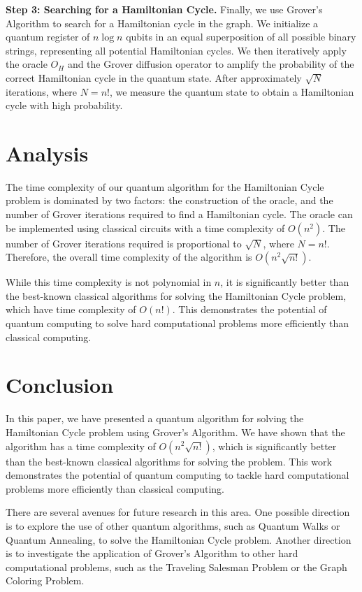 \textbf{Step 3: Searching for a Hamiltonian Cycle.} Finally, we use Grover's Algorithm to search for a Hamiltonian cycle in the graph. We initialize a quantum register of $n \log n$ qubits in an equal superposition of all possible binary strings, representing all potential Hamiltonian cycles. We then iteratively apply the oracle $O_H$ and the Grover diffusion operator to amplify the probability of the correct Hamiltonian cycle in the quantum state. After approximately $\sqrt{N}$ iterations, where $N = n!$, we measure the quantum state to obtain a Hamiltonian cycle with high probability.

\section{Analysis}
\label{sec:analysis}

The time complexity of our quantum algorithm for the Hamiltonian Cycle problem is dominated by two factors: the construction of the oracle, and the number of Grover iterations required to find a Hamiltonian cycle. The oracle can be implemented using classical circuits with a time complexity of $O(n^2)$. The number of Grover iterations required is proportional to $\sqrt{N}$, where $N = n!$. Therefore, the overall time complexity of the algorithm is $O(n^2 \sqrt{n!})$.

While this time complexity is not polynomial in $n$, it is significantly better than the best-known classical algorithms for solving the Hamiltonian Cycle problem, which have time complexity of $O(n!)$. This demonstrates the potential of quantum computing to solve hard computational problems more efficiently than classical computing.

\section{Conclusion}
\label{sec:conclusion}

In this paper, we have presented a quantum algorithm for solving the Hamiltonian Cycle problem using Grover's Algorithm. We have shown that the algorithm has a time complexity of $O(n^2 \sqrt{n!})$, which is significantly better than the best-known classical algorithms for solving the problem. This work demonstrates the potential of quantum computing to tackle hard computational problems more efficiently than classical computing.

There are several avenues for future research in this area. One possible direction is to explore the use of other quantum algorithms, such as Quantum Walks or Quantum Annealing, to solve the Hamiltonian Cycle problem. Another direction is to investigate the application of Grover's Algorithm to other hard computational problems, such as the Traveling Salesman Problem or the Graph Coloring Problem.

